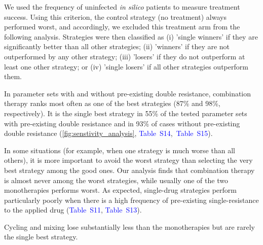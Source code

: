 \documentclass[9pt,twocolumn,twoside,lineno]{pnas-new}
\newcommand{\sitab}[1]{\textcolor{blue}{Table~S#1}}
\begin{document}
    We used the frequency of uninfected \textit{in silico} patients to measure treatment success. 
    Using this criterion, the control strategy (no treatment) always performed worst, and accordingly, we excluded this treatment arm from the following analysis.
    Strategies were then classified as (i) 'single winners' if they are significantly better than all other strategies; (ii) 'winners' if they are not outperformed by any other strategy; (iii) 'losers' if they do not outperform at least one other strategy; or (iv) 'single losers' if all other strategies outperform them.
    
    In parameter sets with and without pre-existing double resistance, combination therapy ranks most often as one of the best strategies (87\%  and 98\%, respectively). 
    It is the single best strategy in 55\% of the tested parameter sets with pre-existing double resistance and in 93\% of cases without pre-existing double resistance (\autoref{fig:senstivity_analysis}, \sitab{14},~\sitab{15}). 
    
    In some situations (for example, when one strategy is much worse than all others), it is more important to avoid the worst strategy than selecting the very best strategy among the good ones. 
    Our analysis finds that combination therapy is almost never among the worst strategies, while usually one of the two monotherapies performs worst.
    As expected, single-drug strategies perform particularly poorly when there is a high frequency of pre-existing single-resistance to the applied drug (\sitab{11}, \sitab{13}).
    
    Cycling and mixing lose substantially less than the monotherapies but are rarely the single best strategy. 
    
\end{document}
